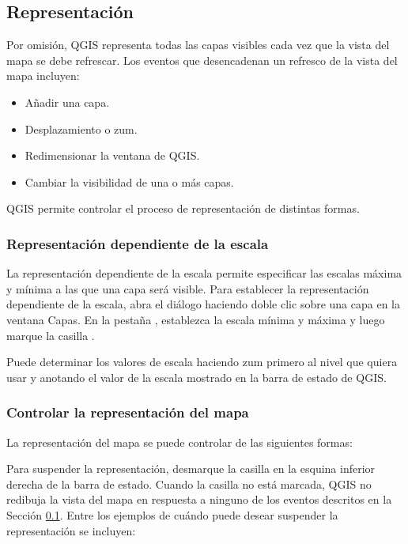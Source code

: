 \subsection{Representación}\label{subsec:redraw_events}

Por omisión, QGIS representa todas las capas visibles cada vez que la vista del mapa se debe refrescar. Los eventos 
que desencadenan un refresco de la vista del mapa incluyen:

\begin{itemize}
\item Añadir una capa.
\item Desplazamiento o zum.
\item Redimensionar la ventana de QGIS.
\item Cambiar la visibilidad de una o más capas.
\end{itemize}

QGIS permite controlar el proceso de representación de distintas formas.

\subsubsection{Representación dependiente de la escala}
\label{label_scaledepend}

La representación dependiente de la escala permite especificar las escalas máxima y mínima a las que una capa será 
visible. Para establecer la representación dependiente de la escala, abra el diálogo   haciendo 
doble clic sobre una capa en la ventana Capas. En la pestaña , establezca la escala mínima y máxima y luego marque la casilla .

Puede determinar los valores de escala haciendo zum primero al nivel que quiera usar y anotando el valor de la 
escala mostrado en la barra de estado de QGIS.

\subsubsection{Controlar la representación del mapa}\label{label_controlmap}

La representación del mapa se puede controlar de las siguientes formas:

\label{label_suspendrender}

Para suspender la representación, desmarque la casilla  en la esquina inferior derecha de la 
barra de estado. Cuando la casilla  no está marcada, QGIS no redibuja la vista del mapa en 
respuesta a ninguno de los eventos descritos en la Sección
\ref{subsec:redraw_events}. Entre los ejemplos de cuándo puede desear suspender la representación se incluyen:

